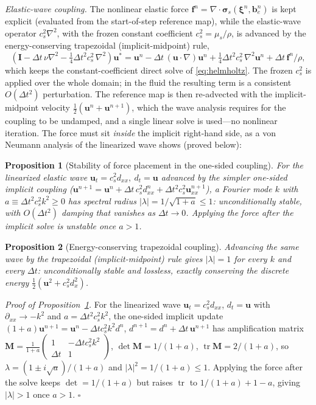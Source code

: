 \documentclass[final,3p,times]{elsarticle}
\newtheorem{proposition}{Proposition}
\theoremstyle{remark}
\newcommand{\uv}{\bm{u}}                 %
\newcommand{\xiv}{\bm{\xi}}              %
\newcommand{\be}{\bm{b}_e}              %
\newcommand{\It}{\bm{I}}                %
\newcommand{\sig}{\bm{\sigma}}          %
\newcommand{\grad}{\nabla}
\newcommand{\dive}{\grad\!\cdot\!}
\newcommand{\dt}{\Delta t}
\begin{document}
\emph{Elastic-wave coupling.} The nonlinear elastic force
$\bm f^n=\dive\sig_{\!s}(\xiv^n,\be^n)$ is kept explicit (evaluated from the start-of-step
reference map), while the elastic-wave operator $c_s^2\nabla^2$, with the frozen constant
coefficient $c_s^2=\mu_s/\rho$, is advanced by the energy-conserving trapezoidal
(implicit-midpoint) rule,
\begin{equation}
\left(\It-\dt\,\nu\nabla^2-\tfrac14\dt^2 c_s^2\,\nabla^2\right)\uv^{*}
   = \uv^{n}-\dt\,(\uv\!\cdot\!\grad)\uv^{n}+\tfrac14\dt^2 c_s^2\,\nabla^2\uv^{n}+\dt\,\bm f^n/\rho,
\label{eq:elastic-stab}
\end{equation}
which keeps the constant-coefficient direct solve of \cref{eq:helmholtz}. The frozen $c_s^2$ is
applied over the whole domain; in the fluid the resulting term is a consistent $O(\dt^2)$
perturbation. The reference map is then re-advected with the implicit-midpoint velocity
$\tfrac12(\uv^n+\uv^{n+1})$, which the wave analysis requires for the coupling to be undamped,
and a single linear solve is used---no nonlinear iteration. The force must sit
\emph{inside} the implicit right-hand side, as a von Neumann analysis of the linearized wave
shows (proved below):

\begin{proposition}[Stability of force placement in the one-sided coupling]
\label{prop:vn}
For the linearized elastic wave $\uv_t=c_s^2 d_{xx},\ d_t=\uv$ advanced by the simpler one-sided
implicit coupling ($\uv^{n+1}=\uv^n+\dt\,c_s^2 d^n_{xx}+\dt^2 c_s^2\uv^{n+1}_{xx}$), a Fourier
mode $k$ with $a\equiv\dt^2 c_s^2 k^2\ge0$ has spectral radius $|\lambda|=1/\sqrt{1+a}\le1$:
unconditionally stable, with $O(\dt^2)$ damping that vanishes as $\dt\to0$. Applying the force
after the implicit solve is unstable once $a>1$.
\end{proposition}

\begin{proposition}[Energy-conserving trapezoidal coupling]
\label{prop:trap}
Advancing the same wave by the trapezoidal (implicit-midpoint) rule gives $|\lambda|=1$ for
every $k$ and every $\dt$: unconditionally stable and lossless, exactly conserving the
discrete energy $\tfrac12(\uv^2+c_s^2 d_x^2)$.
\end{proposition}

\noindent\emph{Proof of Proposition~\ref{prop:vn}.} For the linearized wave
$\uv_t=c_s^2 d_{xx}$, $d_t=\uv$ with $\partial_{xx}\to-k^2$ and $a=\dt^2 c_s^2 k^2$, the one-sided
implicit update $(1+a)\uv^{n+1}=\uv^n-\dt c_s^2 k^2 d^n$, $d^{n+1}=d^n+\dt\,\uv^{n+1}$ has
amplification matrix $\bm M=\tfrac{1}{1+a}\left(\begin{smallmatrix}1 & -\dt c_s^2 k^2\\ \dt & 1\end{smallmatrix}\right)$,
$\det\bm M=1/(1+a)$, $\operatorname{tr}\bm M=2/(1+a)$, so $\lambda=(1\pm i\sqrt a)/(1+a)$ and
$|\lambda|^2=1/(1+a)\le1$. Applying the force after the solve keeps $\det=1/(1+a)$ but
raises $\operatorname{tr}$ to $1/(1+a)+1-a$, giving $|\lambda|>1$ once $a>1$. \hfill$\square$
\end{document}
